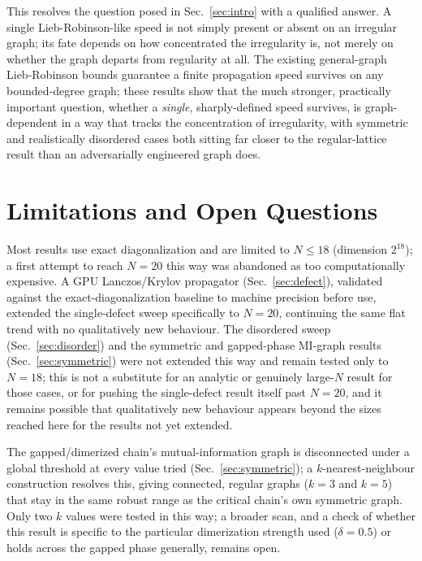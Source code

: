 \documentclass[11pt]{article}
\begin{document}
This resolves the question posed in Sec.~\ref{sec:intro} with a qualified answer. A single Lieb-Robinson-like speed is not simply present or absent on an irregular graph; its fate depends on how concentrated the irregularity is, not merely on whether the graph departs from regularity at all. The existing general-graph Lieb-Robinson bounds \cite{NachtergaeleSims2007} guarantee a finite propagation speed survives on any bounded-degree graph; these results show that the much stronger, practically important question, whether a \emph{single}, sharply-defined speed survives, is graph-dependent in a way that tracks the concentration of irregularity, with symmetric and realistically disordered cases both sitting far closer to the regular-lattice result than an adversarially engineered graph does.

\section{Limitations and Open Questions}
\label{sec:limitations}

Most results use exact diagonalization and are limited to $N\leq18$ (dimension $2^{18}$); a first attempt to reach $N=20$ this way was abandoned as too computationally expensive. A GPU Lanczos/Krylov propagator (Sec.~\ref{sec:defect}), validated against the exact-diagonalization baseline to machine precision before use, extended the single-defect sweep specifically to $N=20$, continuing the same flat trend with no qualitatively new behaviour. The disordered sweep (Sec.~\ref{sec:disorder}) and the symmetric and gapped-phase MI-graph results (Sec.~\ref{sec:symmetric}) were not extended this way and remain tested only to $N=18$; this is not a substitute for an analytic or genuinely large-$N$ result for those cases, or for pushing the single-defect result itself past $N=20$, and it remains possible that qualitatively new behaviour appears beyond the sizes reached here for the results not yet extended.

The gapped/dimerized chain's mutual-information graph is disconnected under a global threshold at every value tried (Sec.~\ref{sec:symmetric}); a $k$-nearest-neighbour construction resolves this, giving connected, regular graphs ($k=3$ and $k=5$) that stay in the same robust range as the critical chain's own symmetric graph. Only two $k$ values were tested in this way; a broader scan, and a check of whether this result is specific to the particular dimerization strength used ($\delta=0.5$) or holds across the gapped phase generally, remains open.
\end{document}
